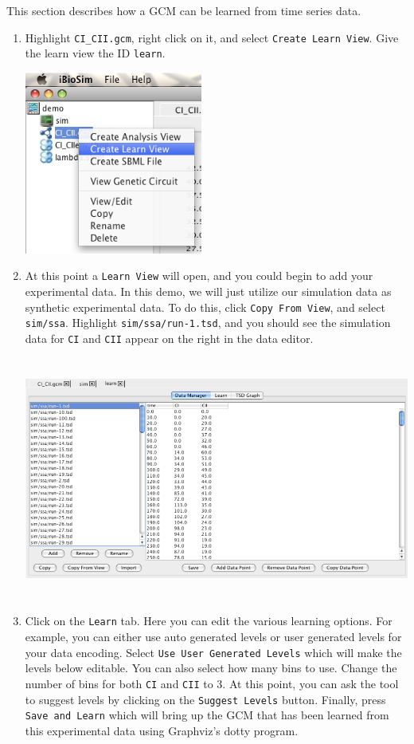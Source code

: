 \documentclass[titlepage,11pt]{article}
\begin{document}
This section describes how a GCM can be learned from time series data.
\begin{enumerate}
\item Highlight {\tt CI\_CII.gcm}, right click on it, and select
{\tt Create Learn View}.  Give the learn view the ID {\tt learn}.

\includegraphics[height=60mm]{screenshots/createLearn}

\item At this point a {\tt Learn View} will open, and you could begin
to add your experimental data.  In this demo, we will just utilize our
simulation data as synthetic experimental data.  To do this, click
{\tt Copy From View}, and select {\tt sim/ssa}.  Highlight 
{\tt sim/ssa/run-1.tsd}, and you should see the simulation data for 
{\tt CI} and {\tt CII} appear on the right in the data editor. 

\includegraphics[height=80mm]{screenshots/dataManager}

\clearpage

\item Click on the {\tt Learn} tab.  Here you can edit the various
  learning options.  For example, you can either use auto generated
  levels or user generated levels for your data encoding.  Select 
{\tt Use User Generated Levels} which will make the levels below
editable.  You can also select how many bins to use.  Change the
number of bins for both {\tt CI} and {\tt CII} to 3.  At this point,
you can ask the tool to suggest levels by clicking on the {\tt Suggest
  Levels} button.  Finally, press {\tt Save and Learn} which will
bring up the GCM that has been learned from this experimental data
using Graphviz's dotty program.


\end{enumerate}
\end{document}
